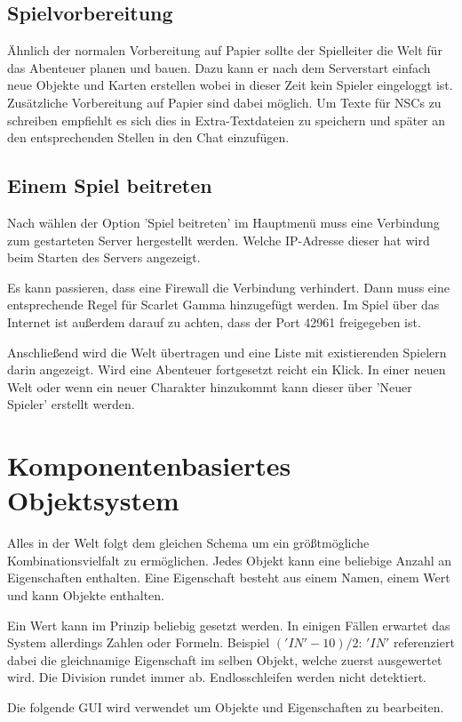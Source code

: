\documentclass[german,10pt,a4paper,twocolumn,colorscheme=darkblue]{orarticle}
\begin{document}
		\subsection{Spielvorbereitung}
			Ähnlich der normalen Vorbereitung auf Papier sollte der Spielleiter die Welt für das Abenteuer planen und bauen. Dazu kann er nach dem Serverstart einfach neue Objekte und Karten erstellen wobei in dieser Zeit kein Spieler eingeloggt ist. Zusätzliche Vorbereitung auf Papier sind dabei möglich. Um Texte für NSCs zu schreiben empfiehlt es sich dies in Extra-Textdateien zu speichern und später an den entsprechenden Stellen in den Chat einzufügen.
		
		\subsection{Einem Spiel beitreten}
			Nach wählen der Option 'Spiel beitreten' im Hauptmenü muss eine Verbindung zum gestarteten Server hergestellt werden. Welche IP-Adresse dieser hat wird beim Starten des Servers angezeigt.
			
			Es kann passieren, dass eine Firewall die Verbindung verhindert. Dann muss eine entsprechende Regel für Scarlet Gamma hinzugefügt werden. Im Spiel über das Internet ist außerdem darauf zu achten, dass der Port 42961 freigegeben ist.
			
			Anschließend wird die Welt übertragen und eine Liste mit existierenden Spielern darin angezeigt. Wird eine Abenteuer fortgesetzt reicht ein Klick. In einer neuen Welt oder wenn ein neuer Charakter hinzukommt kann dieser über 'Neuer Spieler' erstellt werden.
		
	\section{Komponentenbasiertes Objektsystem}
		Alles in der Welt folgt dem gleichen Schema um ein größtmögliche Kombinationsvielfalt zu ermöglichen. Jedes Objekt kann eine beliebige Anzahl an Eigenschaften enthalten. Eine Eigenschaft besteht aus einem Namen, einem Wert und kann Objekte enthalten.
		
		Ein Wert kann im Prinzip beliebig gesetzt werden. In einigen Fällen erwartet das System allerdings Zahlen oder Formeln. Beispiel $('IN'-10)/2$: $'IN'$ referenziert dabei die gleichnamige Eigenschaft im selben Objekt, welche zuerst ausgewertet wird. Die Division rundet immer ab. Endlosschleifen werden nicht detektiert.
		
		Die folgende GUI wird verwendet um Objekte und Eigenschaften zu bearbeiten.
		
\end{document}
